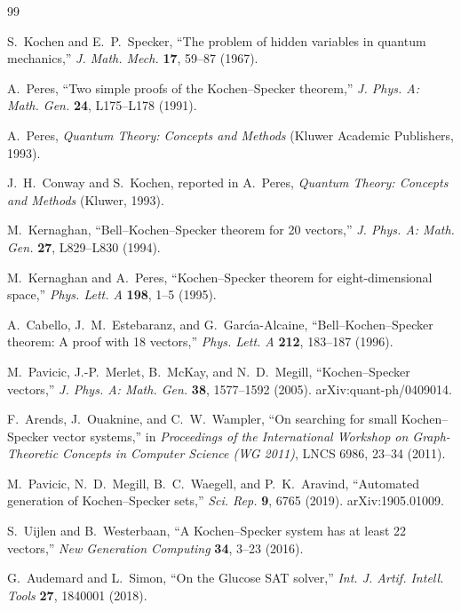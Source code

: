 \documentclass[twocolumn,pra,superscriptaddress,nofootinbib]{revtex4-2}
\begin{document}
\begin{thebibliography}{99}

S.~Kochen and E.~P.~Specker, ``The problem of hidden variables in quantum
mechanics,'' \textit{J. Math. Mech.} \textbf{17}, 59--87 (1967).

A.~Peres, ``Two simple proofs of the Kochen--Specker theorem,''
\textit{J. Phys. A: Math. Gen.} \textbf{24}, L175--L178 (1991).

A.~Peres, \textit{Quantum Theory: Concepts and Methods}
(Kluwer Academic Publishers, 1993).

J.~H.~Conway and S.~Kochen, reported in A.~Peres,
\textit{Quantum Theory: Concepts and Methods} (Kluwer, 1993).

M.~Kernaghan, ``Bell--Kochen--Specker theorem for 20 vectors,''
\textit{J. Phys. A: Math. Gen.} \textbf{27}, L829--L830 (1994).

M.~Kernaghan and A.~Peres, ``Kochen--Specker theorem for eight-dimensional
space,'' \textit{Phys. Lett. A} \textbf{198}, 1--5 (1995).

A.~Cabello, J.~M.~Estebaranz, and G.~Garc\'{\i}a-Alcaine,
``Bell--Kochen--Specker theorem: A proof with 18 vectors,''
\textit{Phys. Lett. A} \textbf{212}, 183--187 (1996).

M.~Pavicic, J.-P.~Merlet, B.~McKay, and N.~D.~Megill,
``Kochen--Specker vectors,''
\textit{J. Phys. A: Math. Gen.} \textbf{38}, 1577--1592 (2005).
arXiv:quant-ph/0409014.

F.~Arends, J.~Ouaknine, and C.~W.~Wampler,
``On searching for small Kochen--Specker vector systems,''
in \textit{Proceedings of the International Workshop on Graph-Theoretic
Concepts in Computer Science (WG 2011)}, LNCS 6986, 23--34 (2011).

M.~Pavicic, N.~D.~Megill, B.~C.~Waegell, and P.~K.~Aravind,
``Automated generation of Kochen--Specker sets,''
\textit{Sci. Rep.} \textbf{9}, 6765 (2019). arXiv:1905.01009.

S.~Uijlen and B.~Westerbaan,
``A Kochen--Specker system has at least 22 vectors,''
\textit{New Generation Computing} \textbf{34}, 3--23 (2016).

G.~Audemard and L.~Simon,
``On the Glucose SAT solver,''
\textit{Int. J. Artif. Intell. Tools} \textbf{27}, 1840001 (2018).


\end{thebibliography}
\end{document}
